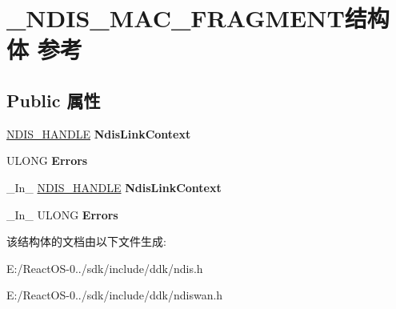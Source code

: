 \hypertarget{struct___n_d_i_s___m_a_c___f_r_a_g_m_e_n_t}{}\section{\+\_\+\+N\+D\+I\+S\+\_\+\+M\+A\+C\+\_\+\+F\+R\+A\+G\+M\+E\+N\+T结构体 参考}
\label{struct___n_d_i_s___m_a_c___f_r_a_g_m_e_n_t}
\subsection*{Public 属性}
\begin{DoxyCompactItemize}
\item 
\mbox{\label{struct___n_d_i_s___m_a_c___f_r_a_g_m_e_n_t_a6a16d102a34b04c97c0d0f495a7bddfd}} 
\hyperlink{interfacevoid}{N\+D\+I\+S\+\_\+\+H\+A\+N\+D\+LE} {\bfseries Ndis\+Link\+Context}
\item 
\mbox{\label{struct___n_d_i_s___m_a_c___f_r_a_g_m_e_n_t_a40245bb2580f8e89a3cfa50cfd2c1bd9}} 
U\+L\+O\+NG {\bfseries Errors}
\item 
\mbox{\label{struct___n_d_i_s___m_a_c___f_r_a_g_m_e_n_t_af4d86c64f255df457b4312331fc27c2e}} 
\+\_\+\+In\+\_\+ \hyperlink{interfacevoid}{N\+D\+I\+S\+\_\+\+H\+A\+N\+D\+LE} {\bfseries Ndis\+Link\+Context}
\item 
\mbox{\label{struct___n_d_i_s___m_a_c___f_r_a_g_m_e_n_t_a68eb91ea7dbf4a5e403e7a409221a567}} 
\+\_\+\+In\+\_\+ U\+L\+O\+NG {\bfseries Errors}
\end{DoxyCompactItemize}


该结构体的文档由以下文件生成\+:\begin{DoxyCompactItemize}
\item 
E\+:/\+React\+O\+S-\/0../sdk/include/ddk/ndis.\+h\item 
E\+:/\+React\+O\+S-\/0../sdk/include/ddk/ndiswan.\+h\end{DoxyCompactItemize}

